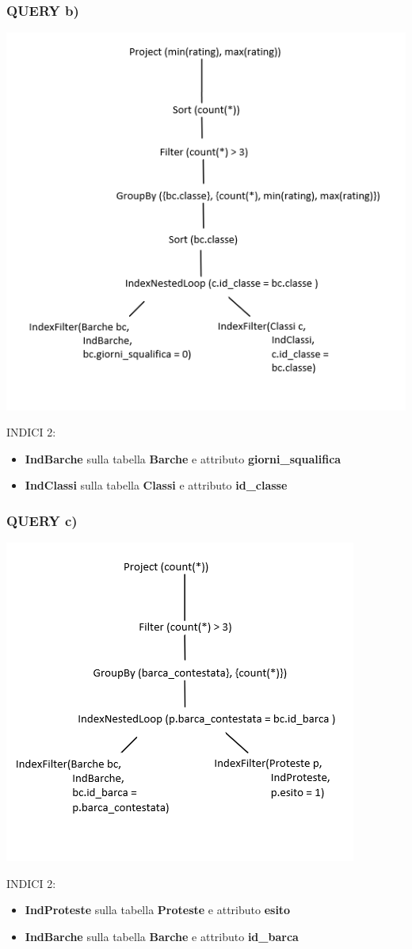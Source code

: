 \documentclass{article}
\begin{document}
\subsubsection{QUERY b)}
\includegraphics[]{fisicoindb.png}
\begin{flushleft}
INDICI 2:
\begin{itemize}
    \item \textbf{IndBarche} sulla tabella \textbf{Barche} e attributo \textbf{giorni\_squalifica}
    \item \textbf{IndClassi} sulla tabella \textbf{Classi} e attributo \textbf{id\_classe}
\end{itemize}
\end{flushleft}

\newpage
\subsubsection{QUERY c)}
\includegraphics[]{fisicoindc.png}

\begin{flushleft}
INDICI 2:
\begin{itemize}
    \item \textbf{IndProteste} sulla tabella \textbf{Proteste} e attributo \textbf{esito}
    \item \textbf{IndBarche} sulla tabella \textbf{Barche} e attributo \textbf{id\_barca}
\end{itemize}
\end{flushleft}
\end{document}
